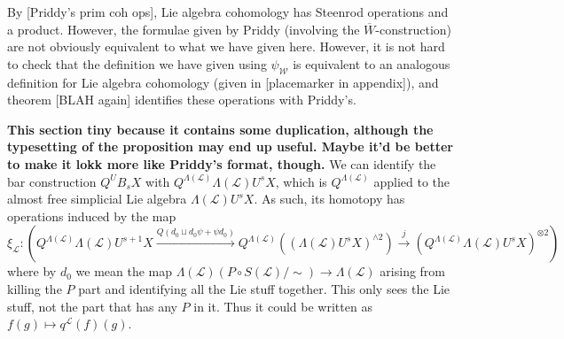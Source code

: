 \documentclass[11pt]{amsart}
\theoremstyle{plain}
\theoremstyle{definition}
\renewcommand{\to}{\longrightarrow}
\newcommand{\scrL}{\mathscr{L}}
\newcommand{\calW}{\mathcal{W}}
\theoremstyle{plain}
\newcommand{\LieOperad}{{\scrL}}
\begin{document}
\begin{Cohomology operations for unstable Lie algebras over P}
By [Priddy's prim coh ops], Lie algebra cohomology has Steenrod operations and a product. However, the formulae given by Priddy (involving the $\overline{W}$-construction) are not obviously equivalent to what we have given here. However, it is not hard to check that the definition we have given using $\psi_\calW$ is equivalent to an analogous definition for Lie algebra cohomology (given in [placemarker in appendix]), and theorem [BLAH again] identifies these operations with Priddy's.

{\tiny
\textbf{This section tiny because it contains some duplication, although the typesetting of the proposition may end up useful. Maybe it'd be better to make it lokk more like Priddy's format, though.} We can identify the bar construction $Q^UB_sX$ with
$Q^{\Lambda(\LieOperad)}\Lambda(\LieOperad)U^sX$,
which is $Q^{\Lambda(\LieOperad)}$ applied to the almost free simplicial Lie algebra $\Lambda(\LieOperad)U^sX$. As such, its homotopy has operations induced by the map
\[\xi_\LieOperad:\left(Q^{\Lambda(\LieOperad)}\Lambda(\LieOperad)U^{s+1}X
\overset{Q(d_0\sqcup d_0\psi+\psi d_0)}{\to}
Q^{\Lambda(\LieOperad)}((\Lambda(\LieOperad)U^sX)^{\wedge2})\overset{j}{\to}
(Q^{\Lambda(\LieOperad)} \Lambda(\LieOperad)U^sX)^{\otimes2}\right)\]
where by $d_0$ we mean the map $\Lambda(\LieOperad)(P\circ S(\LieOperad)/\sim)\to \Lambda(\LieOperad)$ arising from killing the $P$ part and identifying all the Lie stuff together. This only sees the Lie stuff, not the part that has any $P$ in it. Thus it could be written as $f(g)\mapsto q^\LieOperad(f)(g)$.

}
\end{Cohomology operations for unstable Lie algebras over P}
\end{document}

